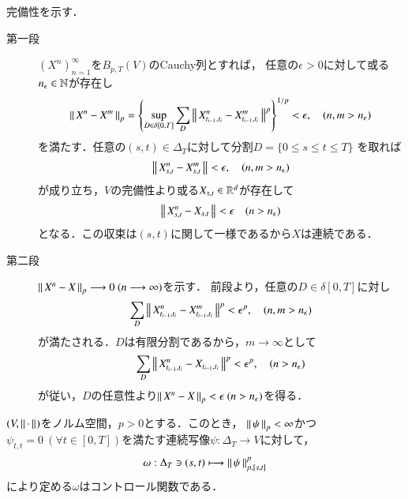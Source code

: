 \begin{prf}完備性を示す．
	\begin{description}
		\item[第一段] $(X^n)_{n=1}^{\infty}$を$B_{p,T}(V)$のCauchy列とすれば，
			任意の$\epsilon > 0$に対して或る$n_\epsilon \in \mathbb{N}$が存在し
			\begin{align}
				\left\|\, X^n - X^m\, \right\|_{p}
				= \left\{ \operatorname*{sup}_{D \in \delta[0,T]} \sum_{D} 
				\left\|\, X^n_{t_{i-1},t_i} - X^m_{t_{i-1},t_i}\, \right\|_{}^p \right\}^{1/p} < \epsilon,
				\quad (n,m > n_\epsilon)
			\end{align}
			を満たす．任意の$(s,t) \in \Delta_T$に対して分割$D = \{0 \leq s \leq t \leq T\}$
			を取れば
			\begin{align}
				\left\|\, X^n_{s,t} - X^m_{s,t}\, \right\|_{} < \epsilon,
				\quad (n,m > n_\epsilon)
			\end{align}
			が成り立ち，$V$の完備性より或る$X_{s,t} \in \mathbb{R}^d$が存在して
			\begin{align}
				\left\|\, X^n_{s,t} - X_{s,t}\, \right\|_{} < \epsilon
				\quad (n > n_\epsilon)
			\end{align}
			となる．この収束は$(s,t)$に関して一様であるから$X$は連続である．
			
		\item[第二段] $\left\|\, X^n - X\, \right\|_{p} \longrightarrow 0\ (n \longrightarrow \infty)$を示す．
			前段より，任意の$D \in \delta[0,T]$に対し
			\begin{align}
				\sum_D \left\|\, X^n_{t_{i-1},t_i} - X^m_{t_{i-1},t_i}\, \right\|_{}^p
				< \epsilon^p,
				\quad (n,m > n_\epsilon)
			\end{align}
			が満たされる．$D$は有限分割であるから，$m \longrightarrow \infty$として
			\begin{align}
				\sum_D \left\|\, X^n_{t_{i-1},t_i} - X_{t_{i-1},t_i}\, \right\|_{}^p
				< \epsilon^p,
				\quad (n > n_\epsilon)
			\end{align}
			が従い，$D$の任意性より$\left\|\, X^n - X\, \right\|_{p} < \epsilon\ (n > n_\epsilon)$を得る．
			\QED
	\end{description}
\end{prf}

	\begin{screen}
		\begin{thm}[$p$-変動が定めるコントロール関数]
		\label{thm:control_function_defined_by_p_variation}
			$(V,\left\|\, \cdot\, \right\|_{})$をノルム空間，$p > 0$とする．このとき，
			$\left\|\, \psi\, \right\|_{p} < \infty$かつ$\psi_{t,t} = 0\ (\forall t \in [0,T])$を満たす連続写像$\psi:\Delta_T \longrightarrow V$に対して，
			\begin{align}
				\omega:\Delta_T \ni (s,t) \longmapsto \left\|\, \psi\, \right\|_{p,[s,t]}^p
			\end{align}
			により定める$\omega$はコントロール関数である．
		\end{thm}
	\end{screen}
	
